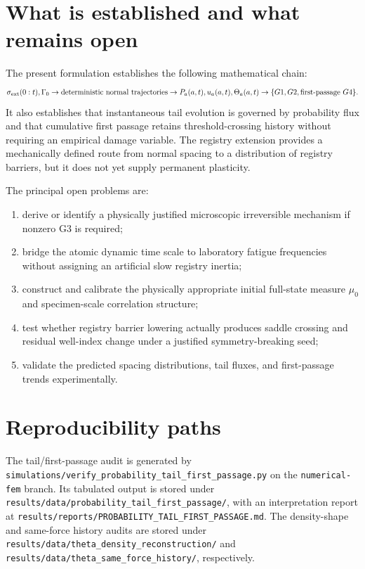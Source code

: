 \documentclass[11pt]{article}
\begin{document}
\section{What is established and what remains open}
The present formulation establishes the following mathematical chain:
\begin{equation}
\sigma_{\rm ext}(0:t),\Gamma_0
\rightarrow
\text{deterministic normal trajectories}
\rightarrow
P_a(a,t),u_a(a,t),\Theta_a(a,t)
\rightarrow
\{G1,G2,\text{first-passage }G4\}.
\end{equation}
It also establishes that instantaneous tail evolution is governed by probability flux and that cumulative first passage retains threshold-crossing history without requiring an empirical damage variable. The registry extension provides a mechanically defined route from normal spacing to a distribution of registry barriers, but it does not yet supply permanent plasticity.

The principal open problems are:
\begin{enumerate}
\item derive or identify a physically justified microscopic irreversible mechanism if nonzero G3 is required;
\item bridge the atomic dynamic time scale to laboratory fatigue frequencies without assigning an artificial slow registry inertia;
\item construct and calibrate the physically appropriate initial full-state measure \(\mu_0\) and specimen-scale correlation structure;
\item test whether registry barrier lowering actually produces saddle crossing and residual well-index change under a justified symmetry-breaking seed;
\item validate the predicted spacing distributions, tail fluxes, and first-passage trends experimentally.
\end{enumerate}

\section{Reproducibility paths}
The tail/first-passage audit is generated by
\texttt{simulations/verify\_probability\_tail\_first\_passage.py}
on the \texttt{numerical-fem} branch. Its tabulated output is stored under
\texttt{results/data/probability\_tail\_first\_passage/}, with an interpretation report at
\texttt{results/reports/PROBABILITY\_TAIL\_FIRST\_PASSAGE.md}.
The density-shape and same-force history audits are stored under
\texttt{results/data/theta\_density\_reconstruction/} and
\texttt{results/data/theta\_same\_force\_history/}, respectively.
\end{document}
